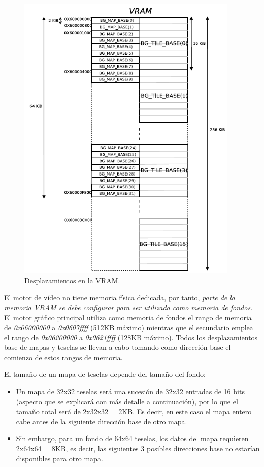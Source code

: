 \begin{figure}[t]
\centering
\includegraphics[height=14cm]{Figuras/C7/c7_mem_teselas.PNG}
\caption{Desplazamientos en la VRAM.}
\label{fig_p2_c3_teselas3}
\end{figure}

El motor de vídeo no tiene memoria física dedicada, por tanto, \textit{parte de la memoria VRAM se debe configurar para ser utilizada como memoria de fondos}. El motor gráfico principal utiliza como memoria de fondos el rango de memoria de \textit{0x06000000} a \textit{0x0607ffff} (512KB máximo) mientras que el secundario emplea el rango de \textit{0x06200000} a \textit{0x0621ffff} (128KB máximo). Todos los desplazamientos base de mapas y teselas se llevan a cabo tomando como dirección base el comienzo de estos rangos de memoria.

El tamaño de un mapa de teselas depende del tamaño del fondo:
\begin{itemize}
\item  Un mapa de 32x32 teselas será una sucesión de 32x32 entradas de 16 bits (aspecto que se explicará con más detalle a continuación), por lo que el tamaño total será de 2x32x32 = 2KB. Es decir, en este caso el mapa entero cabe antes de la siguiente dirección base de otro mapa.
%
\item  Sin embargo, para un fondo de 64x64 teselas, los datos del mapa requieren 2x64x64 = 8KB, es decir, las siguientes 3 posibles direcciones base no estarían disponibles para otro mapa.
\end{itemize}

